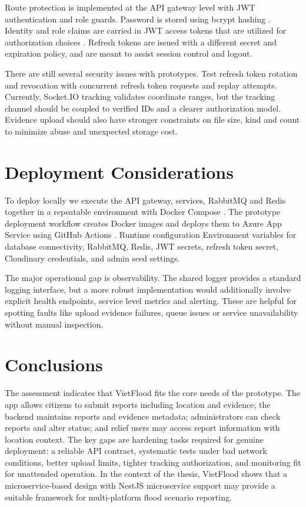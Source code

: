 Route protection is implemented at the API gateway level with JWT authentication and role guards. Password is stored using bcrypt hashing \cite{provos1999bcrypt}. Identity and role claims are carried in JWT access tokens that are utilized for authorization choices \cite{jones2015jwt}. Refresh tokens are issued with a different secret and expiration policy, and are meant to assist session control and logout.

There are still several security issues with prototypes. Test refresh token rotation and revocation with concurrent refresh token requests and replay attempts. Currently, Socket.IO tracking validates coordinate ranges, but the tracking channel should be coupled to verified IDs and a clearer authorization model. Evidence upload should also have stronger constraints on file size, kind and count to minimize abuse and unexpected storage cost.

\section{Deployment Considerations}

To deploy locally we execute the API gateway, services, RabbitMQ and Redis together in a repeatable environment with Docker Compose \cite{dockerComposeDocs}. The prototype deployment workflow creates Docker images and deploys them to Azure App Service using GitHub Actions \cite{githubActionsDocs,azureAppServiceContainersDocs}. Runtime configuration Environment variables for database connectivity, RabbitMQ, Redis, JWT secrets, refresh token secret, Cloudinary credentials, and admin seed settings.

The major operational gap is observability. The shared logger provides a standard logging interface, but a more robust implementation would additionally involve explicit health endpoints, service level metrics and alerting. These are helpful for spotting faults like upload evidence failures, queue issues or service unavailability without manual inspection.

\section{Conclusions}

The assessment indicates that VietFlood fits the core needs of the prototype. The app allows citizens to submit reports including location and evidence; the backend maintains reports and evidence metadata; administrators can check reports and alter status; and relief users may access report information with location context. The key gaps are hardening tasks required for genuine deployment: a reliable API contract, systematic tests under bad network conditions, better upload limits, tighter tracking authorization, and monitoring fit for unattended operation. In the context of the thesis, VietFlood shows that a microservice-based design with NestJS microservice support \cite{nestjsMicroservicesDocs} may provide a suitable framework for multi-platform flood scenario reporting.
